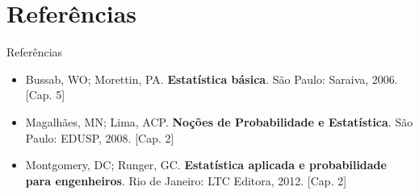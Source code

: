 \documentclass[10pt]{beamer}\usepackage[]{graphicx}\usepackage[]{color}
\theoremstyle{definition}
\begin{document}

\section{Referências}


\begin{frame}{Referências}
  \begin{itemize}
  \item Bussab, WO; Morettin, PA. \textbf{Estatística básica}. São
    Paulo: Saraiva, 2006. [Cap. 5]
  \item Magalhães, MN; Lima, ACP. \textbf{Noções de Probabilidade e
      Estatística}. São Paulo: EDUSP, 2008. [Cap. 2]
  \item Montgomery, DC; Runger, GC. \textbf{Estatística aplicada e
      probabilidade para engenheiros}. Rio de Janeiro: LTC Editora,
    2012. [Cap. 2]
  \end{itemize}
\end{frame}
\end{document}
